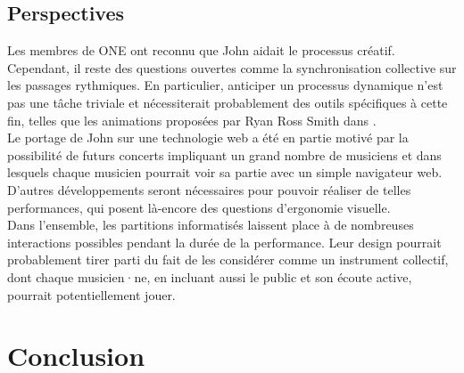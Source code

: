 \subsection{Perspectives}

\noindent Les membres de ONE ont reconnu que John aidait le processus créatif. Cependant, il reste des questions ouvertes comme la synchronisation collective sur les passages rythmiques. En particulier, anticiper un processus dynamique n'est pas une tâche triviale et nécessiterait probablement des outils spécifiques à cette fin, telles que les animations proposées par Ryan Ross Smith dans \cite{smith_atomic_2015}.\\
\indent Le portage de John sur une technologie web a été en partie motivé par la possibilité de futurs concerts impliquant un grand nombre de musiciens et dans lesquels chaque musicien pourrait voir sa partie avec un simple navigateur web. D'autres développements seront nécessaires pour pouvoir réaliser de telles performances, qui posent là-encore des questions d'ergonomie visuelle.\\
\indent Dans l'ensemble, les partitions informatisés laissent place à de nombreuses interactions possibles pendant la durée de la performance. Leur design pourrait probablement tirer parti du fait de les considérer comme un instrument collectif, dont chaque musicien·ne, en incluant aussi le public et son écoute active, pourrait potentiellement jouer.


\section{Conclusion}

